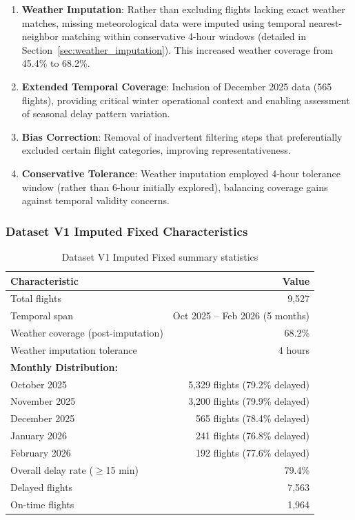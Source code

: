 \documentclass{report}
\begin{document}
\begin{enumerate}
    \item \textbf{Weather Imputation}: Rather than excluding flights lacking exact weather matches, missing meteorological data were imputed using temporal nearest-neighbor matching within conservative 4-hour windows (detailed in Section~\ref{sec:weather_imputation}). This increased weather coverage from 45.4\% to 68.2\%.
    
    \item \textbf{Extended Temporal Coverage}: Inclusion of December 2025 data (565 flights), providing critical winter operational context and enabling assessment of seasonal delay pattern variation.
    
    \item \textbf{Bias Correction}: Removal of inadvertent filtering steps that preferentially excluded certain flight categories, improving representativeness.
    
    \item \textbf{Conservative Tolerance}: Weather imputation employed 4-hour tolerance window (rather than 6-hour initially explored), balancing coverage gains against temporal validity concerns.
\end{enumerate}

\subsubsection{Dataset V1 Imputed Fixed Characteristics}

\begin{table}[h]
\centering
\caption{Dataset V1 Imputed Fixed summary statistics}
\label{tab:phase2_summary}
\begin{tabular}{lr}
\toprule
\textbf{Characteristic} & \textbf{Value} \\
\midrule
Total flights & 9,527 \\
Temporal span & Oct 2025 -- Feb 2026 (5 months) \\
Weather coverage (post-imputation) & 68.2\% \\
Weather imputation tolerance & 4 hours \\
\midrule
\textbf{Monthly Distribution:} & \\
October 2025 & 5,329 flights (79.2\% delayed) \\
November 2025 & 3,200 flights (79.9\% delayed) \\
December 2025 & 565 flights (78.4\% delayed) \\
January 2026 & 241 flights (76.8\% delayed) \\
February 2026 & 192 flights (77.6\% delayed) \\
\midrule
Overall delay rate ($\geq$15 min) & 79.4\% \\
Delayed flights & 7,563 \\
On-time flights & 1,964 \\
\bottomrule
\end{tabular}
\end{table}
\end{document}
